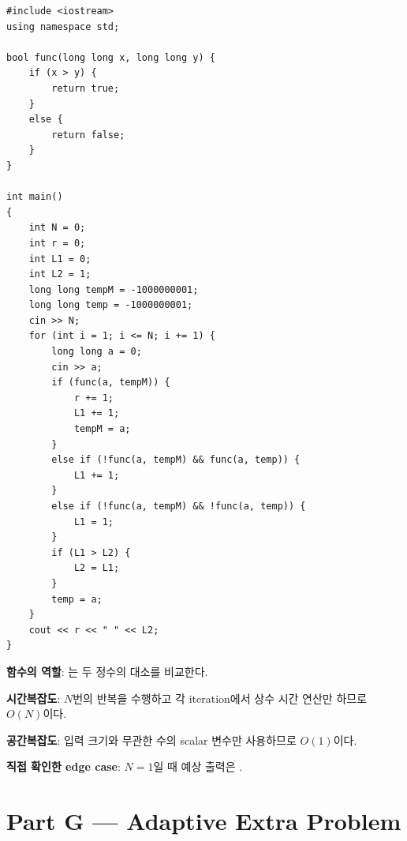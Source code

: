 \begin{answerbox}[학습자 제출 답안]
\begin{lstlisting}
#include <iostream>
using namespace std;

bool func(long long x, long long y) {
    if (x > y) {
        return true;
    }
    else {
        return false;
    }
}

int main()
{
    int N = 0;
    int r = 0;
    int L1 = 0;
    int L2 = 1;
    long long tempM = -1000000001;
    long long temp = -1000000001;
    cin >> N;
    for (int i = 1; i <= N; i += 1) {
        long long a = 0;
        cin >> a;
        if (func(a, tempM)) {
            r += 1;
            L1 += 1;
            tempM = a;
        }
        else if (!func(a, tempM) && func(a, temp)) {
            L1 += 1;
        }
        else if (!func(a, tempM) && !func(a, temp)) {
            L1 = 1;
        }
        if (L1 > L2) {
            L2 = L1;
        }
        temp = a;
    }
    cout << r << " " << L2;
}
\end{lstlisting}

\textbf{함수의 역할}: 는 두 정수의 대소를 비교한다.

\textbf{시간복잡도}: $N$번의 반복을 수행하고 각 iteration에서 상수 시간 연산만 하므로 $O(N)$이다.

\textbf{공간복잡도}: 입력 크기와 무관한 수의 scalar 변수만 사용하므로 $O(1)$이다.

\textbf{직접 확인한 edge case}: $N=1$일 때 예상 출력은 .
\end{answerbox}

\section{Part G --- Adaptive Extra Problem}

